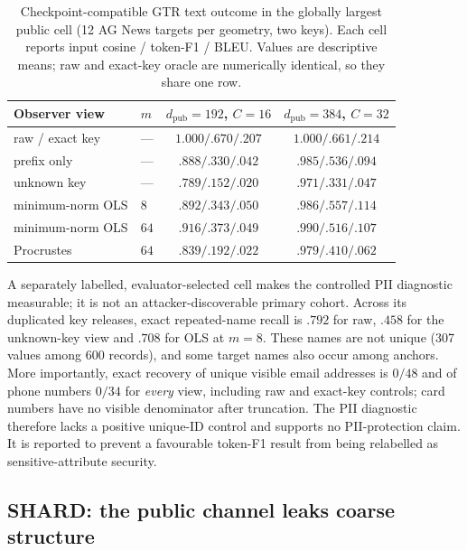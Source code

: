 \documentclass[11pt,a4paper]{article}
\begin{document}
\begin{table}[H]
\centering
\caption{Checkpoint-compatible GTR text outcome in the globally largest
public cell (12 AG News targets per geometry, two keys). Each cell reports
input cosine / token-F1 / BLEU. Values are descriptive means; raw and
exact-key oracle are numerically identical, so they share one row.}
\label{tab:shard-text}
\small
\begin{tabular}{@{}llcc@{}}
\toprule
Observer view & $m$ & $d_{\mathrm{pub}}{=}192$, $C{=}16$ & $d_{\mathrm{pub}}{=}384$, $C{=}32$ \\ \midrule
raw / exact key & --- & $1.000/.670/.207$ & $1.000/.661/.214$ \\
prefix only & --- & $.888/.330/.042$ & $.985/.536/.094$ \\
unknown key & --- & $.789/.152/.020$ & $.971/.331/.047$ \\
minimum-norm OLS & $8$ & $.892/.343/.050$ & $.986/.557/.114$ \\
minimum-norm OLS & $64$ & $.916/.373/.049$ & $.990/.516/.107$ \\
Procrustes & $64$ & $.839/.192/.022$ & $.979/.410/.062$ \\
\bottomrule
\end{tabular}
\end{table}

A separately labelled, evaluator-selected cell makes the controlled PII
diagnostic measurable; it is not an attacker-discoverable primary cohort.
Across its duplicated key releases, exact repeated-name recall is $.792$ for
raw, $.458$ for the unknown-key view and $.708$ for OLS at $m=8$. These names
are not unique (307 values among 600 records), and some target names also occur
among anchors. More importantly, exact recovery of unique visible email
addresses is $0/48$ and of phone numbers $0/34$ for \emph{every} view,
including raw and exact-key controls; card numbers have no visible denominator
after truncation. The PII diagnostic therefore lacks a positive unique-ID
control and supports no PII-protection claim. It is reported to prevent a
favourable token-F1 result from being relabelled as sensitive-attribute
security.

\FloatBarrier
\subsection{SHARD: the public channel leaks coarse structure}\label{ssec:shard-leak}
\end{document}

